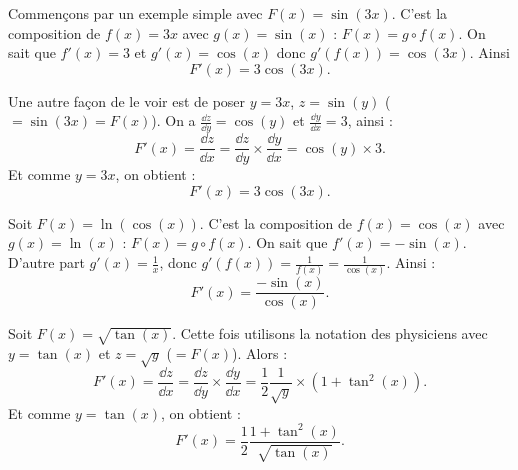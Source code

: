 \documentclass[11pt,class=report,crop=false]{standalone}
\begin{document}
\begin{exemple}
Commençons par un exemple simple avec $F(x) = \sin(3x)$. C'est la composition de $f(x) = 3x$ avec $g(x) = \sin(x)$ : $F(x) = g \circ f(x)$.
On sait que $f'(x) = 3$ et $g'(x) = \cos(x)$ donc $g'(f(x)) = \cos(3x)$.
Ainsi 
$$F'(x) = 3\cos(3x).$$

Une autre façon de le voir est de poser $y = 3x$, $z = \sin(y)$ ($= \sin(3x) = F(x)$).
On a $\frac{\dd z}{\dd y} = \cos(y)$ et $\frac{\dd y}{\dd x} = 3$, ainsi :
$$F'(x) =  \frac{\dd z}{\dd x}  
= \frac{\dd z}{\dd y} \times \frac{\dd y}{\dd x}
= \cos(y) \times 3.$$
Et comme $y = 3x$, on obtient :
$$F'(x) = 3\cos(3x).$$
\end{exemple}

\begin{exemple}
Soit $F(x) = \ln(\cos(x))$. C'est la composition de $f(x) = \cos(x)$ avec $g(x) = \ln(x)$ : $F(x) = g \circ f(x)$.
On sait que $f'(x) = - \sin(x)$. D'autre part $g'(x) = \frac1x$, donc $g'(f(x)) = \frac{1}{f(x)}= \frac{1}{\cos(x)}$.
Ainsi :
$$F'(x) = \frac{-\sin(x)}{\cos(x)}.$$
\end{exemple}

\begin{exemple}
Soit $F(x) = \sqrt{\tan(x)}$. Cette fois utilisons la notation des physiciens avec  $y= \tan(x)$ et $z = \sqrt{y}$ ($= F(x)$).
Alors :
$$F'(x) =  \frac{\dd z}{\dd x}  
= \frac{\dd z}{\dd y} \times \frac{\dd y}{\dd x}
= \frac12\frac{1}{\sqrt{y}} \times (1+\tan^2(x)).$$
Et comme $y = \tan(x)$, on obtient :
$$F'(x) = \frac12 \frac{1+\tan^2(x)}{\sqrt{\tan(x)}}.$$
\end{exemple}

\bigskip
\end{document}
